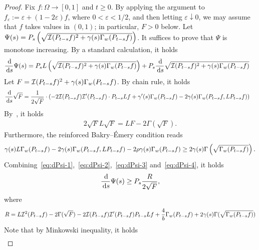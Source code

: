 \begin{proof}
    Fix $f : \Omega \to [0,1]$ and $t \ge 0$.
    By applying the argument to $f_\varepsilon:=\varepsilon+(1-2\varepsilon)f$, where $0<\varepsilon<1/2$, and then letting $\varepsilon\downarrow0$, we may assume that $f$ takes values in $(0,1)$; in particular, $F>0$ below.
    Let $\Psi(s) = P_s \left(\sqrt{\mathcal{I}(P_{t-s} f)^2 + \gamma(s) \Gamma_w(P_{t-s} f)}\right)$. It suffices to prove that $\Psi$ is monotone increasing. By a standard calculation, it holds
    \begin{align}\label{eq:dPsi-1}
    \frac{\,\mathrm{d}}{\,\mathrm{d} s} \Psi(s) &= P_s L\left(\sqrt{\mathcal{I}(P_{t-s} f)^2 + \gamma(s) \Gamma_w(P_{t-s} f)}\right) + P_s \frac{\,\mathrm{d}}{\,\mathrm{d} s}\sqrt{\mathcal{I}(P_{t-s} f)^2 + \gamma(s) \Gamma_w(P_{t-s} f)}
    \end{align}
    Let $F = \mathcal{I}(P_{t-s} f)^2 + \gamma(s) \Gamma_w(P_{t-s} f)$. By chain rule, it holds
    \begin{align}\label{eq:dPsi-2}
    \frac{\,\mathrm{d}}{\,\mathrm{d} s} \sqrt{F} &= \frac{1}{2\sqrt{F}}\cdot\left(- 2 \mathcal{I}(P_{t-s} f) \mathcal{I}'(P_{t-s} f) \cdot P_{t-s} L f + \gamma'(s) \Gamma_w(P_{t-s} f) - 2\gamma(s) \Gamma_w(P_{t-s} f, L P_{t-s} f)\right)
    \end{align}
    By~, it holds
    \begin{align}\label{eq:dPsi-3}
        2\sqrt{F} L \sqrt{F} =  L F - 2\Gamma(\sqrt{F}).
    \end{align}
    Furthermore, the reinforced Bakry--\'Emery condition reads
    \begin{align}\label{eq:dPsi-4}
        \gamma(s) L \Gamma_w(P_{t-s} f) - 2 \gamma(s) \Gamma_w(P_{t-s} f, L P_{t-s} f) - 2\rho \gamma(s) \Gamma_w(P_{t-s} f) \ge 2 \gamma(s)\Gamma\left(\sqrt{\Gamma_w(P_{t-s} f)}\right).
    \end{align}
    Combining~\eqref{eq:dPsi-1},~\eqref{eq:dPsi-2},~\eqref{eq:dPsi-3} and~\eqref{eq:dPsi-4}, it holds
    \begin{align}\label{eq:dPsi-5}
    \frac{\,\mathrm{d} }{\,\mathrm{d} s} \Psi(s) \ge P_s \frac{R}{2\sqrt{F}},
    \end{align}
    where
    \begin{align}\label{eq:dPsi-6}
    R = L \mathcal{I}^2 (P_{t-s} f) - 2 \Gamma(\sqrt{F}) - 2 \mathcal{I}(P_{t-s} f) \mathcal{I}'(P_{t-s} f) P_{t-s} L f+ \frac{4}{b}\Gamma_w(P_{t-s} f) + 2\gamma(s) \Gamma(\sqrt{\Gamma_w(P_{t-s}f)})
    \end{align}
    Note that by Minkowski inequality, it holds
    \begin{align*}

\end{align*}
\end{proof}
